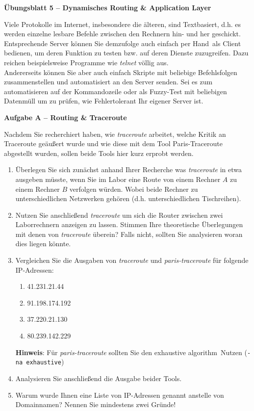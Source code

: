 \documentclass[paper=a4,fontsize=11pt]{scrartcl}%
\numberwithin{equation}{section}
\begin{document}
\begin{center}
\Large{\textbf{Übungsblatt 5 -- Dynamisches Routing \& Application Layer}}
\end{center}
Viele Protokolle im Internet, insbesondere die älteren, sind Textbasiert, d.h. es werden einzelne lesbare Befehle zwischen den Rechnern hin- und her geschickt. Entsprechende Server können Sie demzufolge auch einfach \glqq per Hand\grqq\ als Client bedienen, um deren Funktion zu testen bzw. auf deren Dienste zuzugreifen. Dazu reichen beispielsweise Programme wie \emph{telnet} völlig aus.\\
Andererseits können Sie aber auch einfach Skripte mit beliebige Befehlsfolgen zusammenstellen und automatisiert an den Server senden. Sei es zum automatisieren auf der Kommandozeile oder als Fuzzy-Test mit beliebigen Datenmüll um zu prüfen, wie Fehlertolerant Ihr eigener Server ist.
	
\begin{center}\Large{\textbf{Aufgabe A -- Routing \& Traceroute}}\end{center}\vskip0.25in
Nachdem Sie recherchiert haben, wie \emph{traceroute} arbeitet, welche Kritik an Traceroute geäußert wurde und wie diese mit dem Tool Paris-Traceroute abgestellt wurden, sollen beide Tools hier kurz erprobt werden.
\begin{enumerate}
	\item Überlegen Sie sich zunächst anhand Ihrer Recherche was \emph{traceroute} in etwa ausgeben müsste, wenn Sie im Labor eine Route von einem Rechner $A$ zu einem Rechner $B$ verfolgen würden. Wobei beide Rechner zu unterschiedlichen Netzwerken gehören (d.h. unterschiedlichen Tischreihen). 
	\item Nutzen Sie anschließend \emph{traceroute} um sich die Router zwischen zwei Laborrechnern anzeigen zu lassen. Stimmen Ihre theoretische Überlegungen mit denen von \emph{traceroute} überein? Falls nicht, sollten Sie analysieren woran dies liegen könnte.
	\item Vergleichen Sie die Ausgaben von \emph{traceroute} und \emph{paris-traceroute} für folgende IP-Adressen:
	\begin{enumerate}
		\item 41.231.21.44
		\item 91.198.174.192
		\item 37.220.21.130
		\item 80.239.142.229
	\end{enumerate}
	\textbf{Hinweis}: Für \emph{paris-traceroute} sollten Sie den \glqq exhaustive algorithm\grqq\ Nutzen (\texttt{-na exhaustive})
	\item Analysieren Sie anschließend die Ausgabe beider Tools.
	\item Warum wurde Ihnen eine Liste von IP-Adressen genannt anstelle von Domainnamen? Nennen Sie mindestens zwei Gründe!
\end{enumerate}
\end{document}
